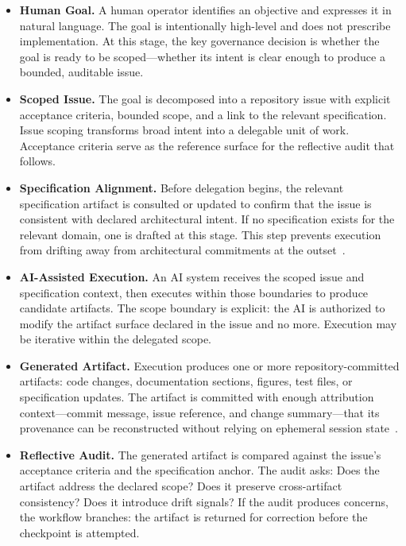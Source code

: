 \begin{itemize}
  \item \textbf{Human Goal.} A human operator identifies an objective and expresses it in natural language. The goal is intentionally high-level and does not prescribe implementation. At this stage, the key governance decision is whether the goal is ready to be scoped---whether its intent is clear enough to produce a bounded, auditable issue.

  \item \textbf{Scoped Issue.} The goal is decomposed into a repository issue with explicit acceptance criteria, bounded scope, and a link to the relevant specification. Issue scoping transforms broad intent into a delegable unit of work. Acceptance criteria serve as the reference surface for the reflective audit that follows.

  \item \textbf{Specification Alignment.} Before delegation begins, the relevant specification artifact is consulted or updated to confirm that the issue is consistent with declared architectural intent. If no specification exists for the relevant domain, one is drafted at this stage. This step prevents execution from drifting away from architectural commitments at the outset~\cite{Parnas1972Modularization}.

  \item \textbf{AI-Assisted Execution.} An AI system receives the scoped issue and specification context, then executes within those boundaries to produce candidate artifacts. The scope boundary is explicit: the AI is authorized to modify the artifact surface declared in the issue and no more. Execution may be iterative within the delegated scope.

  \item \textbf{Generated Artifact.} Execution produces one or more repository-committed artifacts: code changes, documentation sections, figures, test files, or specification updates. The artifact is committed with enough attribution context---commit message, issue reference, and change summary---that its provenance can be reconstructed without relying on ephemeral session state~\cite{Lamport1978TimeClocks}.

  \item \textbf{Reflective Audit.} The generated artifact is compared against the issue's acceptance criteria and the specification anchor. The audit asks: Does the artifact address the declared scope? Does it preserve cross-artifact consistency? Does it introduce drift signals? If the audit produces concerns, the workflow branches: the artifact is returned for correction before the checkpoint is attempted.


\end{itemize}
